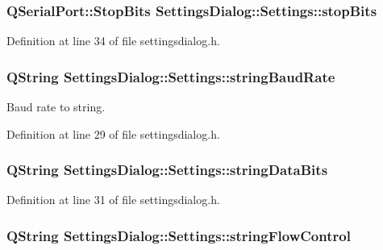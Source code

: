 \subsubsection[{stop\+Bits}]{\setlength{\rightskip}{0pt plus 5cm}Q\+Serial\+Port\+::\+Stop\+Bits Settings\+Dialog\+::\+Settings\+::stop\+Bits}\label{struct_settings_dialog_1_1_settings_ab88ff384f7c1127bcbe2dd97b49696a4}


Definition at line 34 of file settingsdialog.\+h.

\hypertarget{struct_settings_dialog_1_1_settings_a54e9d461f783386f314bc24b96665e53}{}
\subsubsection[{string\+Baud\+Rate}]{\setlength{\rightskip}{0pt plus 5cm}Q\+String Settings\+Dialog\+::\+Settings\+::string\+Baud\+Rate}\label{struct_settings_dialog_1_1_settings_a54e9d461f783386f314bc24b96665e53}


Baud rate to string. 



Definition at line 29 of file settingsdialog.\+h.

\hypertarget{struct_settings_dialog_1_1_settings_ab589b733b78af17744ab75067bfce051}{}
\subsubsection[{string\+Data\+Bits}]{\setlength{\rightskip}{0pt plus 5cm}Q\+String Settings\+Dialog\+::\+Settings\+::string\+Data\+Bits}\label{struct_settings_dialog_1_1_settings_ab589b733b78af17744ab75067bfce051}


Definition at line 31 of file settingsdialog.\+h.

\hypertarget{struct_settings_dialog_1_1_settings_a1b0a388ec5059bd2628acf9b7728f2f3}{}
\subsubsection[{string\+Flow\+Control}]{\setlength{\rightskip}{0pt plus 5cm}Q\+String Settings\+Dialog\+::\+Settings\+::string\+Flow\+Control}\label{struct_settings_dialog_1_1_settings_a1b0a388ec5059bd2628acf9b7728f2f3}


